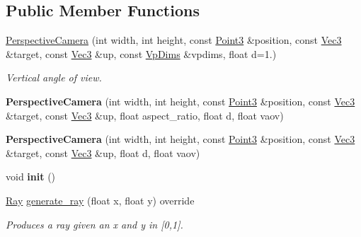 \subsection*{Public Member Functions}
\begin{DoxyCompactItemize}
\item 
\mbox{\label{classomg_1_1_perspective_camera_a47871acb18140e1fab0a0ebd0396a3ae}} 
\mbox{\hyperlink{classomg_1_1_perspective_camera_a47871acb18140e1fab0a0ebd0396a3ae}{Perspective\+Camera}} (int width, int height, const \mbox{\hyperlink{namespaceomg_af3df7d66f0c70fe64649fcbe00edba5e}{Point3}} \&position, const \mbox{\hyperlink{namespaceomg_acf927839a305877d454c507f0b96730b}{Vec3}} \&target, const \mbox{\hyperlink{namespaceomg_acf927839a305877d454c507f0b96730b}{Vec3}} \&up, const \mbox{\hyperlink{structomg_1_1_camera_1_1_vp_dims}{Vp\+Dims}} \&vpdims, float d=1.)
\begin{DoxyCompactList}\small\item\em Vertical angle of view. \end{DoxyCompactList}\item 
\mbox{\label{classomg_1_1_perspective_camera_a9148417266fda27d5438ace4ee63f9dd}} 
{\bfseries Perspective\+Camera} (int width, int height, const \mbox{\hyperlink{namespaceomg_af3df7d66f0c70fe64649fcbe00edba5e}{Point3}} \&position, const \mbox{\hyperlink{namespaceomg_acf927839a305877d454c507f0b96730b}{Vec3}} \&target, const \mbox{\hyperlink{namespaceomg_acf927839a305877d454c507f0b96730b}{Vec3}} \&up, float aspect\+\_\+ratio, float d, float vaov)
\item 
\mbox{\label{classomg_1_1_perspective_camera_a5c466e416ace786d3a15b40b4edfd365}} 
{\bfseries Perspective\+Camera} (int width, int height, const \mbox{\hyperlink{namespaceomg_af3df7d66f0c70fe64649fcbe00edba5e}{Point3}} \&position, const \mbox{\hyperlink{namespaceomg_acf927839a305877d454c507f0b96730b}{Vec3}} \&target, const \mbox{\hyperlink{namespaceomg_acf927839a305877d454c507f0b96730b}{Vec3}} \&up, float d, float vaov)
\item 
\mbox{\label{classomg_1_1_perspective_camera_a98f41e4dc92c2c9beabf7c235f5dd4eb}} 
void {\bfseries init} ()
\item 
\mbox{\hyperlink{classomg_1_1_ray}{Ray}} \mbox{\hyperlink{classomg_1_1_perspective_camera_a6d849c2b0768f12aed7b50d3ce87afeb}{generate\+\_\+ray}} (float x, float y) override
\begin{DoxyCompactList}\small\item\em Produces a ray given an x and y in \mbox{[}0,1\mbox{]}. \end{DoxyCompactList}\end{DoxyCompactItemize}

